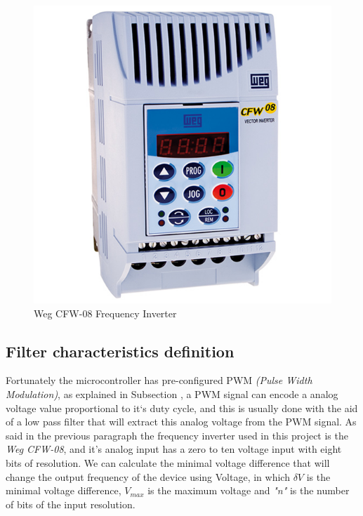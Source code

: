 		\begin{figure}[htbp]
			\centering
				\includegraphics[scale=0.4]{figuras/fig-wegCFW08}
			\caption{Weg CFW-08 Frequency Inverter \cite{fig-wegCFW08}}
			\label{fig:wegCFW08}
		\end{figure}

	\subsection{Filter characteristics definition}\label{ssec:filterCharacteristicsDefinition}
		\par
		Fortunately the microcontroller has pre-configured PWM \textit{(Pulse Width Modulation)}, as explained in Subsection %
, a PWM signal can encode a analog voltage value proportional to it`s duty cycle, and this is usually done with the aid of a low pass filter that will extract this analog voltage from the PWM signal. As said in the previous paragraph the frequency inverter used in this project is the \textit{Weg CFW-08}, and it's analog input has a zero to ten voltage input with eight bits of resolution. We can calculate the minimal voltage difference that will change the output frequency of the device using Voltage, in which $\delta V$ is the minimal voltage difference, $V_{max}$ is the maximum voltage and \textit{"n"} is the number of bits of the input resolution.

